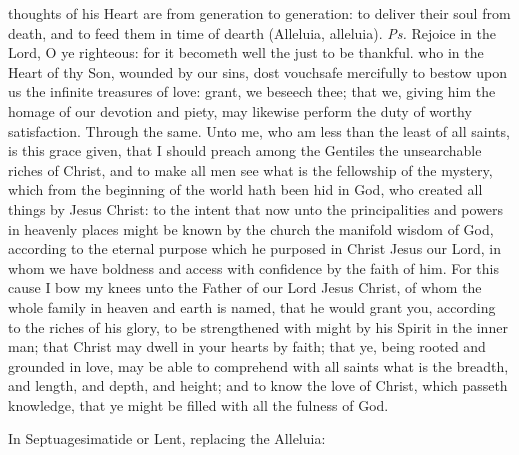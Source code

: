 \introit
{} thoughts of his Heart are from generation to generation: to deliver their soul from death, and to feed them in time of dearth (Alleluia, alleluia). \textit{Ps.} Rejoice in the Lord, O ye righteous: for it becometh well the just to be thankful.
\collect
{} who in the Heart of thy Son, wounded by our sins, dost vouchsafe mercifully to bestow upon us the infinite treasures of love: grant, we beseech thee; that we, giving him the homage of our devotion and piety, may likewise perform the duty of worthy satisfaction. Through the same.
 Unto me, who am less than the least of all saints, is this grace given, that I should preach among the Gentiles the unsearchable riches of Christ, and to make all men see what is the fellowship of the mystery, which from the beginning of the world hath been hid in God, who created all things by Jesus Christ: to the intent that now unto the principalities and powers in heavenly places might be known by the church the manifold wisdom of God, according to the eternal purpose which he purposed in Christ Jesus our Lord, in whom we have boldness and access with confidence by the faith of him. For this cause I bow my knees unto the Father of our Lord Jesus Christ, of whom the whole family in heaven and earth is named, that he would grant you, according to the riches of his glory, to be strengthened with might by his Spirit in the inner man; that Christ may dwell in your hearts by faith; that ye, being rooted and grounded in love, may be able to comprehend with all saints what is the breadth, and length, and depth, and height; and to know the love of Christ, which passeth knowledge, that ye might be filled with all the fulness of God.


\begin{rubric}
{In Septuagesimatide or Lent, replacing the Alleluia:}
\end{rubric}

\vspace{-1.25\baselineskip}
\par\noindent
{}

